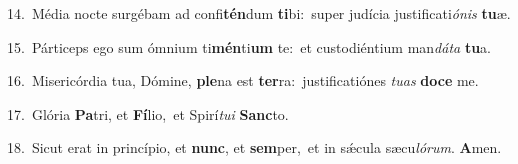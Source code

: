 {\numbfont\textcolor{\numbcolor}{14.}}~Média nocte surgébam ad confi\-\textbf{tén}\-dum \textbf{ti}\-bi:~\star super judícia justificati\-\textit{ó}\-\textit{nis} \textbf{tu}\-æ.\par
{\numbfont\textcolor{\numbcolor}{15.}}~Párticeps ego sum ómnium ti\-\textbf{mén}\-ti\textbf{um} te:~\star et custodiéntium man\-\textit{dá}\-\textit{ta} \textbf{tu}\-a.\par
{\numbfont\textcolor{\numbcolor}{16.}}~Misericórdia tua, Dómine, \textbf{ple}\-na est \textbf{ter}\-ra:~\star justificatiónes \textit{tu}\-\textit{as} \textbf{do}\-\textbf{ce} me.\par
{\numbfont\textcolor{\numbcolor}{17.}}~Glória \textbf{Pa}\-tri, et \textbf{Fí}\-lio,~\star et Spirí\-\textit{tu}\-\textit{i} \textbf{Sanc}\-to.\par
{\numbfont\textcolor{\numbcolor}{18.}}~Sicut erat in princípio, et \textbf{nunc}\-, et \textbf{sem}\-per,~\star et in sǽcula sæcu\-\textit{ló}\-\textit{rum}. \textbf{A}\-men.\par
